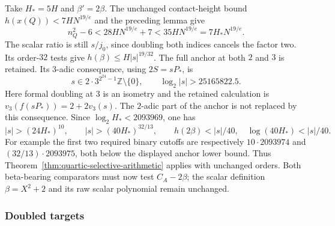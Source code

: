 \documentclass[11pt]{article}
\theoremstyle{definition}
\theoremstyle{remark}
\newcommand{\Z}{\mathbb Z}
\begin{document}
Take $H_*=5H$ and $\beta'=2\beta$. The unchanged contact-height bound
$h(x(Q))<7HN^{19/e}$ and the preceding lemma give
\[
 n_Q^2-6<28HN^{19/e}+7<35HN^{19/e}=7H_*N^{19/e}.
\]
The scalar ratio is still $s/j_0$, since doubling both indices cancels
the factor two. Its order-$32$ tests give
$h(\beta)\le H|s|^{19/32}$. The full anchor at both $2$ and $3$ is
retained. Its $3$-adic consequence, using $2S=sP_*$, is
\[
 s\in2\cdot3^{2^{24}-1}\Z\setminus\{0\},\qquad
 \log_2|s|>25165822.5.
\]
Here formal doubling at $3$ is an isometry and the retained calculation
is $v_3(f(sP_*))=2+2v_3(s)$. The $2$-adic part of the anchor is not
replaced by this consequence. Since $\log_2H_*<2093969$, one has
\[
 |s|>(24H_*)^{10},\qquad |s|>(40H_*)^{32/13},\qquad
 h(2\beta)<|s|/40,\quad\log(40H_*)<|s|/40.
\]
For example the first two required binary cutoffs are respectively
$10\cdot2093974$ and $(32/13)\cdot2093975$, both below the displayed
anchor lower bound. Thus Theorem~\ref{thm:quartic-selective-arithmetic}
applies with unchanged orders. Both beta-bearing comparators must now
test $C_A-2\beta$; the scalar definition $\beta=X^2+2$ and its raw scalar
polynomial remain unchanged.


\subsubsection{Doubled targets}
\label{sec:quartic-target-two-variant}
\end{document}
